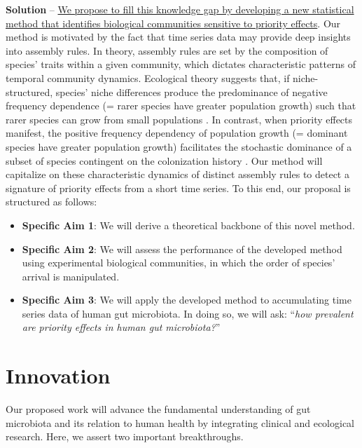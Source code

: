 \documentclass[12pt, class=article, crop=false]{standalone}
\begin{document}
\textbf{Solution} --
\ul{We propose to fill this knowledge gap by developing a new statistical method that identifies biological communities sensitive to priority effects}.
Our method is motivated by the fact that time series data may provide deep insights into assembly rules.
In theory, assembly rules are set by the composition of species' traits within a given community, which dictates characteristic patterns of temporal community dynamics.
Ecological theory suggests that, if niche-structured, species' niche differences produce the predominance of negative frequency dependence (= rarer species have greater population growth) such that rarer species can grow from small populations \citep{loreau_does_2004, carroll_niche_2011, ke_coexistence_2018}.
In contrast, when priority effects manifest, the positive frequency dependency of population growth (= dominant species have greater population growth) facilitates the stochastic dominance of a subset of species contingent on the colonization history \citep{ke_coexistence_2018}.
Our method will capitalize on these characteristic dynamics of distinct assembly rules to detect a signature of priority effects from a short time series.
To this end, our proposal is structured as follows:

\begin{itemize}
    \item \textbf{Specific Aim 1}: We will derive a theoretical backbone of this novel method.
    \item \textbf{Specific Aim 2}: We will assess the performance of the developed method using experimental biological communities, in which the order of species' arrival is manipulated.
    \item \textbf{Specific Aim 3}: We will apply the developed method to accumulating time series data of human gut microbiota. In doing so, we will ask: ``\textit{how prevalent are priority effects in human gut microbiota?}''
\end{itemize}

\section{Innovation}
Our proposed work will advance the fundamental understanding of gut microbiota and its relation to human health by integrating clinical and ecological research.
Here, we assert two important breakthroughs.
\end{document}
